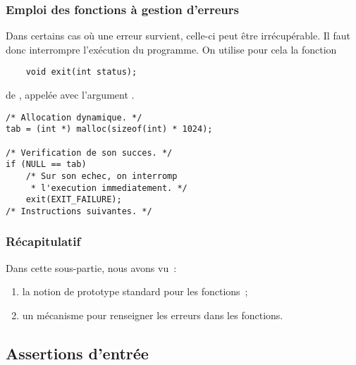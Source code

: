 \begin{frame}[fragile] \frametitle{Emploi des fonctions à gestion d'erreurs}
Dans certains cas où une erreur survient, celle-ci peut être 
irrécupérable. Il faut donc interrompre l'exécution du programme. On
utilise pour cela la fonction
\begin{lstlisting}
    void exit(int status);
\end{lstlisting}
de , appelée avec l'argument .

\begin{lstlisting}
/* Allocation dynamique. */
tab = (int *) malloc(sizeof(int) * 1024);

/* Verification de son succes. */
if (NULL == tab)
    /* Sur son echec, on interromp 
     * l'execution immediatement. */
    exit(EXIT_FAILURE);
/* Instructions suivantes. */
\end{lstlisting}
\end{frame}

\begin{frame}[fragile] \frametitle{Récapitulatif}
Dans cette sous-partie, nous avons vu~:

\begin{enumerate}
    \item la notion de prototype standard pour les fonctions~;
    \smallskip

    \item un mécanisme pour renseigner les erreurs dans les fonctions.
\end{enumerate}
\end{frame}

\subsection{Assertions d'entrée}

